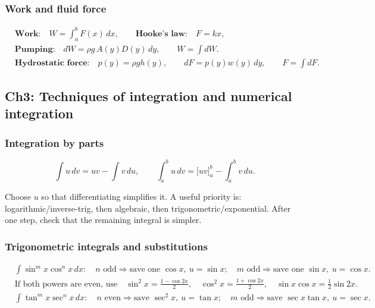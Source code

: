 \subsubsection{Work and fluid force}
\begin{keyformula}[title={Work, Pumping, and Hydrostatic Force}]
\begin{align*}
&\textbf{Work:}\quad W=\int_a^b F(x)\,dx,
\qquad
\textbf{Hooke's law:}\quad F=kx,\\[-0.2em]
&\textbf{Pumping:}\quad dW=\rho g\,A(y)D(y)\,dy,
\qquad W=\int dW.\\[-0.2em]
&\textbf{Hydrostatic force:}\quad p(y)=\rho g h(y),
\qquad dF=p(y)w(y)\,dy,
\qquad F=\int dF.
\end{align*}
\end{keyformula}

\subsection{Ch3: Techniques of integration and numerical integration}

\subsubsection{Integration by parts}
\begin{keyformula}[title={Integration by Parts}]
\[
\int u\,dv=uv-\int v\,du,
\qquad
\int_a^b u\,dv=\bigl[uv\bigr]_a^b-\int_a^b v\,du.
\]
\end{keyformula}

\begin{examtip}
Choose \(u\) so that differentiating simplifies it.  A useful priority is:
logarithmic/inverse-trig, then algebraic, then trigonometric/exponential.
After one step, check that the remaining integral is simpler.
\end{examtip}

\subsubsection{Trigonometric integrals and substitutions}
\begin{keyformula}[title={Trigonometric Integral Decision Rules}]
\begin{align*}
&\int \sin^m x\cos^n x\,dx:
\quad n\text{ odd}\Rightarrow\text{save one }\cos x,\ u=\sin x;\quad
m\text{ odd}\Rightarrow\text{save one }\sin x,\ u=\cos x.\\
&\text{If both powers are even, use}
\quad \sin^2x=\frac{1-\cos2x}{2},\quad
\cos^2x=\frac{1+\cos2x}{2},\quad
\sin x\cos x=\frac12\sin2x.\\
&\int \tan^m x\sec^n x\,dx:
\quad n\text{ even}\Rightarrow\text{save }\sec^2x,\ u=\tan x;\quad
m\text{ odd}\Rightarrow\text{save }\sec x\tan x,\ u=\sec x.
\end{align*}
\end{keyformula}

